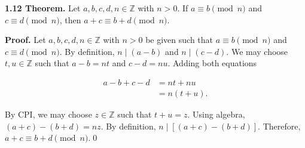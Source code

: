 \documentclass[12pt]{article}
\begin{document}
\noindent\textbf{1.12 Theorem.} Let $a,b,c,d,n\in\mathbb{Z}$ with $n>0$. If $a\equiv b\pmod{n}$ and $c\equiv d\pmod{n}$, then $a+c\equiv b+d\pmod{n}$.

\bigskip

\noindent\textbf{Proof.} Let $a,b,c,d,n\in\mathbb{Z}$ with $n>0$ be given such that $a\equiv b\pmod{n}$ and $c\equiv d\pmod{n}$. By definition, $n\mid(a-b)$ and $n\mid(c-d)$. We may choose $t,u \in \mathbb{Z}$ such that $a-b=nt$ and $c-d=nu$. Adding both equations

\begin{align*}
a-b + c-d &= nt + nu \\
&= n(t+u).
\end{align*}

\noindent By CPI, we may choose $z\in\mathbb{Z}$ such that $t+u=z$. Using algebra, $(a+c)-(b+d)=nz$. By definition, $n\mid[(a+c)-(b+d)]$. Therefore, $a+c\equiv b+d\pmod{n}$.\qed
\end{document}

